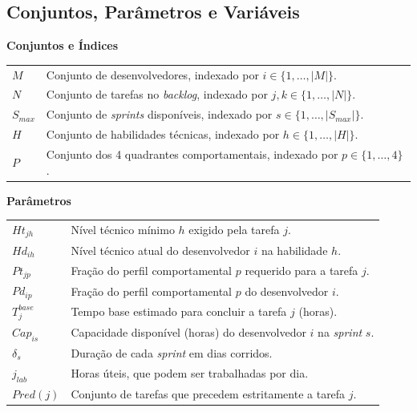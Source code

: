 \documentclass[a4paper,11pt]{article}
\begin{document}
\subsection{Conjuntos, Parâmetros e Variáveis}

\vspace{0.3cm}
\noindent\textbf{Conjuntos e Índices}
\begin{center}
    \begin{tabular}{p{2.5cm} p{12cm}}
        $M$ & Conjunto de desenvolvedores, indexado por $i \in \{1, \dots, |M|\}$. \\
        $N$ & Conjunto de tarefas no \textit{backlog}, indexado por $j, k \in \{1, \dots, |N|\}$. \\
        $S_{max}$ & Conjunto de \textit{sprints} disponíveis, indexado por $s \in \{1, \dots, |S_{max}|\}$. \\
        $H$ & Conjunto de habilidades técnicas, indexado por $h \in \{1, \dots, |H|\}$. \\
        $P$ & Conjunto dos 4 quadrantes comportamentais, indexado por $p \in \{1, \dots, 4\}$.
    \end{tabular}
\end{center}

\vspace{0.3cm}
\noindent\textbf{Parâmetros}
\begin{center}
    \begin{tabular}{p{2.5cm} p{12cm}}
        $Ht_{jh}$ & Nível técnico mínimo $h$ exigido pela tarefa $j$. \\
        $Hd_{ih}$ & Nível técnico atual do desenvolvedor $i$ na habilidade $h$. \\
        $Pt_{jp}$ & Fração do perfil comportamental $p$ requerido para a tarefa $j$. \\
        $Pd_{ip}$ & Fração do perfil comportamental $p$ do desenvolvedor $i$. \\
        $T^{base}_j$ & Tempo base estimado para concluir a tarefa $j$ (horas). \\
        $Cap_{is}$ & Capacidade disponível (horas) do desenvolvedor $i$ na \textit{sprint} $s$. \\
        $\delta_s$ & Duração de cada \textit{sprint} em dias corridos. \\
        $j_{lab}$ & Horas úteis, que podem ser trabalhadas por dia. \\
        $Pred(j)$ & Conjunto de tarefas que precedem estritamente a tarefa $j$.
    \end{tabular}
\end{center}
\end{document}
